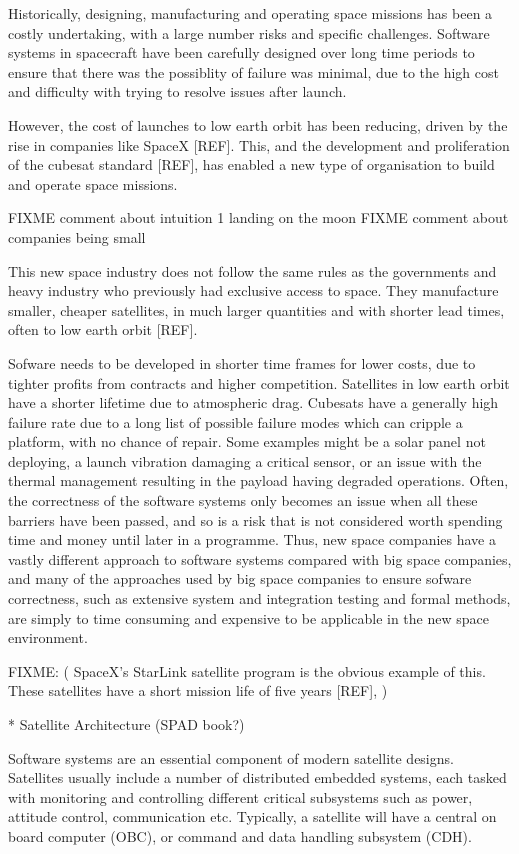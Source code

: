 \documentclass[../report.tex]{subfiles}
\begin{document}
Historically, designing, manufacturing and operating space missions has been a
costly undertaking, with a large number risks and specific challenges. Software
systems in spacecraft have been carefully designed over long time periods to
ensure that there was the possiblity of failure was minimal, due to the high
cost and difficulty with trying to resolve issues after launch.

However, the cost of launches to low earth orbit has been reducing, driven by
the rise in companies like SpaceX [REF]. This, and the development and
proliferation of the cubesat standard [REF], has enabled a new type of
organisation to build and operate space missions.

FIXME comment about intuition 1 landing on the moon
FIXME comment about companies being small

This new space industry does not follow the same rules as the governments and
heavy industry who previously had exclusive access to space. They manufacture
smaller, cheaper satellites, in much larger quantities and with shorter lead
times, often to low earth orbit [REF].

Sofware needs to be developed in shorter time frames for lower costs, due to
tighter profits from contracts and higher competition. Satellites in low earth
orbit have a shorter lifetime due to atmospheric drag. Cubesats have a
generally high failure rate due to a long list of possible failure modes which
can cripple a platform, with no chance of repair. Some examples might be a
solar panel not deploying, a launch vibration damaging a critical sensor, or an
issue with the thermal management resulting in the payload having degraded
operations. Often, the correctness of the software systems only becomes an
issue when all these barriers have been passed, and so is a risk that is not
considered worth spending time and money until later in a programme. Thus, new
space companies have a vastly different approach to software systems compared
with big space companies, and many of the approaches used by big space
companies to ensure sofware correctness, such as extensive system and
integration testing and formal methods, are simply to time consuming and
expensive to be applicable in the new space environment.

FIXME: ( SpaceX's StarLink satellite program is the
obvious example of this. These satellites have a short mission life of five
years [REF], )

* Satellite Architecture (SPAD book?)

Software systems are an essential component of modern satellite designs.
Satellites usually include a number of distributed embedded systems, each
tasked with monitoring and controlling different critical subsystems such as
power, attitude control, communication etc. Typically, a satellite will have a
central on board computer (OBC), or command and data handling subsystem (CDH).
\end{document}
